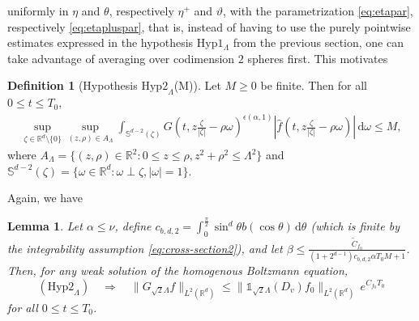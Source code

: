 \documentclass[11pt,a4paper,reqno]{amsart}
\theoremstyle{plain}
\newtheorem{lemma}[proposition]{Lemma}
\theoremstyle{definition}
\newtheorem{definition}[proposition]{Definition}
\begin{document}
uniformly in $\eta$ and $\theta$, respectively $\eta^+$ and $\vartheta$, with the parametrization \eqref{eq:etapar}, respectively \eqref{eq:etapluspar}, that is, instead of having to use the purely pointwise estimates  expressed in the hypothesis $\mathrm{Hyp}1_\Lambda$ from the previous section, one can take advantage of averaging over codimension $2$ spheres first. This motivates

\begin{definition}[Hypothesis $\mathrm{Hyp2}_{\Lambda}$(M)] \label{def:Hyp_Lambda2}
    Let $M\geq 0$ be finite. Then for all $0\le t\le T_0$,
    \begin{align}\label{eq:Hyp_Lambda2}
\sup_{\zeta\in{\mathbb{R}}^d\setminus\{0\}} \sup_{(z,\rho)\in A_{\Lambda}} \int_{{\mathbb{S}}^{d-2}(\zeta)} G\left(t,z\tfrac{\zeta}{|\zeta|} - \rho \omega \right)^{\epsilon(\alpha, 1)} \left|\hat{f}\left(t,z\tfrac{\zeta}{|\zeta|} - \rho \omega \right)\right|\,\mathrm{d}\omega \leq M,
    \end{align}
where $A_{\Lambda} = \{(z, \rho)\in {\mathbb{R}}^2: 0\leq z \leq \rho, z^2 + \rho^2 \leq \Lambda^2\}$ and ${\mathbb{S}}^{d-2}(\zeta) = \{ \omega\in {\mathbb{R}}^d: \omega \perp \zeta, |\omega| = 1\}$.
\end{definition}

Again, we have
\begin{lemma}\label{lem:induction1-2}
	Let $\alpha \leq \nu$, define $c_{b,d,2} = \int_{0}^{\frac{\pi}{2}} \sin^d \theta b(\cos\theta)\,\mathrm{d}\theta$ (which is finite by the integrability assumption \eqref{eq:cross-section2}), and
	let $\beta\le \frac{\tilde{C}_{f_0}}{(1+2^{d-1}) c_{b,d,2}\alpha T_0 M +1}$. Then, for any weak solution of the homogenous Boltzmann equation,
	\begin{equation} \label{eq:inductionbound1-2}
		(\mathrm{Hyp2}_{\Lambda}) \quad \Rightarrow \quad \|G_{\sqrt{2}\Lambda} f \|_{L^2({\mathbb{R}}^d)} \le \|{\mathds{1}}_{\sqrt{2}\Lambda}(D_v) f_0\|_{L^2({\mathbb{R}}^d)} \, e^{C_{f_0}T_0}
	\end{equation}
	for all $0\le t\le T_0$.
\end{lemma}
\end{document}
